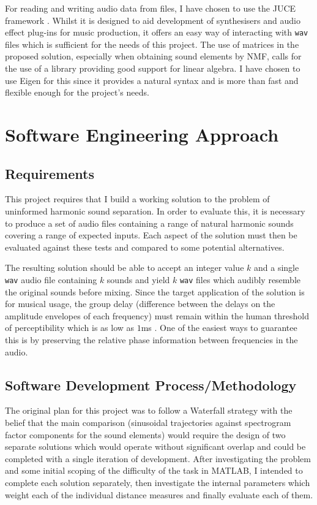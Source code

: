 \documentclass[12pt,a4paper,twoside,openright]{report}
\begin{document}
For reading and writing audio data from files, I have chosen to use the JUCE framework \cite{juce}. Whilst it is designed to aid development of synthesisers and audio effect plug-ins for music production, it offers an easy way of interacting with \texttt{wav} files which is sufficient for the needs of this project. The use of matrices in the proposed solution, especially when obtaining sound elements by NMF, calls for the use of a library providing good support for linear algebra. I have chosen to use Eigen for this since it provides a natural syntax and is more than fast and flexible enough for the project's needs.

\section{Software Engineering Approach}

\subsection{Requirements}

This project requires that I build a working solution to the problem of uninformed harmonic sound separation. In order to evaluate this, it is necessary to produce a set of audio files containing a range of natural harmonic sounds covering a range of expected inputs. Each aspect of the solution must then be evaluated against these tests and compared to some potential alternatives.

The resulting solution should be able to accept an integer value $ k $ and a single \texttt{wav} audio file containing $ k $ sounds and yield $ k $ \texttt{wav} files which audibly resemble the original sounds before mixing. {\color{red}Since the target application of the solution is for musical usage, the group delay (difference between the delays on the amplitude envelopes of each frequency) must remain within the human threshold of perceptibility which is as low as $ 1 $ms \cite{blauert1978group}. One of the easiest ways to guarantee this is by preserving the relative phase information between frequencies in the audio.}

\subsection{Software Development Process/Methodology}

The original plan for this project was to follow a Waterfall strategy with the belief that the main comparison (sinusoidal trajectories against spectrogram factor components for the sound elements) would require the design of two separate solutions which would operate without significant overlap and could be completed with a single iteration of development. After investigating the problem and some initial scoping of the difficulty of the task in MATLAB, I intended to complete each solution separately, then investigate the internal parameters which weight each of the individual distance measures and finally evaluate each of them.
\end{document}
